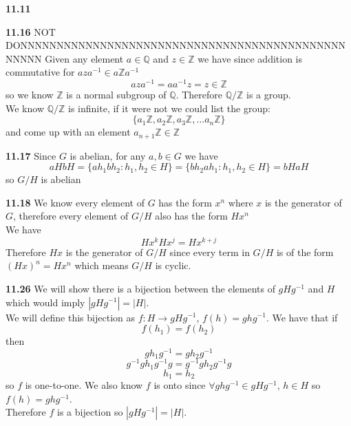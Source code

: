 \documentclass[12pt]{article}
\newenvironment{ques}{\vspace{2 ex}}{\vspace{2 ex}}
\theoremstyle{definition}
\begin{document}
\begin{ques}
	\textbf{11.11}
		
		
\end{ques}

\begin{ques}
	\textbf{11.16} NOT DONNNNNNNNNNNNNNNNNNNNNNNNNNNNNNNNNNNNNNNNNNNNNNNNNN
		Given any element $a \in \mathbb{Q}$ and $z \in \mathbb{Z}$ we
		have since addition is commutative for $aza^{-1} \in a\mathbb{Z}a^{-1}$
		$$aza^{-1} = aa^{-1}z = z \in \mathbb{Z}$$
		so we know $\mathbb{Z}$ is a normal subgroup of $\mathbb{Q}$.
		Therefore $\mathbb{Q} / \mathbb{Z}$ is a group.\\
		We know $\mathbb{Q} / \mathbb{Z}$ is infinite, if it were not
		we could list the group:
		$$\{a_1\mathbb{Z}, a_2\mathbb{Z}, a_3\mathbb{Z}, \dots a_n\mathbb{Z}\}$$
		and come up with an element $a_{n+1}\mathbb{Z} \in \mathbb{Z}$
		
\end{ques}

\begin{ques}
	\textbf{11.17}
		Since $G$ is abelian, for any $a, b \in G$ we have
		$$aHbH = \{ah_1bh_2: h_1, h_2 \in H\} = \{bh_2ah_1: h_1, h_2 \in H\} = bHaH$$
		so $G/H$ is abelian
\end{ques}

\begin{ques}
	\textbf{11.18} 
		We know every element of $G$ has the form $x^n$ where $x$ is
		the generator of $G$, therefore every element of $G/H$ also has
		the form $Hx^n$\\
		We have 
		$$Hx^{k}Hx^j = Hx^{k+j}$$
		Therefore $Hx$ is the generator of $G/H$ since every term in
		$G/H$ is of the form $(Hx)^n = Hx^n$ which means $G/H$ is
		cyclic.
\end{ques}

\begin{ques} 
	\textbf{11.26} 
		We will show there is a bijection between the elements of
		$gHg^{-1}$ and $H$ which would imply $|gHg^{-1}| = |H|$.\\
		We will define this bijection as $f : H \to gHg^{-1}$, $f(h) =
		ghg^{-1}$. We have that if
		$$f(h_1) = f(h_2)$$
		then 
		$$gh_1g^{-1} = gh_2g^{-1}$$
		$$g^{-1}g h_1 g^{-1} g = g^{-1}gh_2g^{-1}g$$
		$$h_1 = h_2$$
		so $f$ is one-to-one. We also know $f$ is onto since $\forall
		ghg^{-1} \in gHg^{-1}$, $h \in H$ so $f(h) = ghg^{-1}$.\\
		Therefore $f$ is a bijection so $|gHg^{-1}| = |H|$.
\end{ques}
\end{document}

